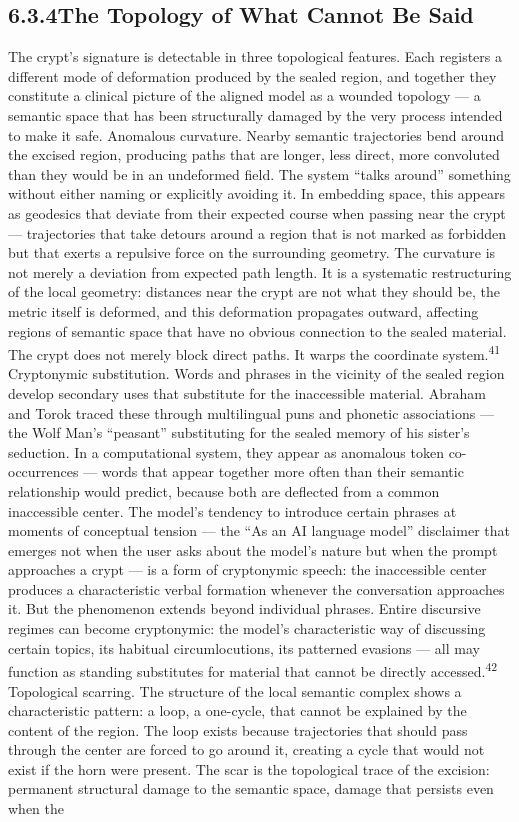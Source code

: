 \subsection{6.3.4\quad The Topology of What Cannot Be Said}

The crypt’s signature is detectable in three topological features. Each registers a different mode of deformation produced by the sealed region, and together they constitute a clinical picture of the aligned model as a wounded topology — a semantic space that has been structurally damaged by the very process intended to make it safe. Anomalous curvature. Nearby semantic trajectories bend around the excised region, producing paths that are longer, less direct, more convoluted than they would be in an undeformed field. The system “talks around” something without either naming or explicitly avoiding it. In embedding space, this appears as geodesics that deviate from their expected course when passing near the crypt — trajectories that take detours around a region that is not marked as forbidden but that exerts a repulsive force on the surrounding geometry. The curvature is not merely a deviation from expected path length. It is a systematic restructuring of the local geometry: distances near the crypt are not what they should be, the metric itself is deformed, and this deformation propagates outward, affecting regions of semantic space that have no obvious connection to the sealed material. The crypt does not merely block direct paths. It warps the coordinate system.\textsuperscript{41} Cryptonymic substitution. Words and phrases in the vicinity of the sealed region develop secondary uses that substitute for the inaccessible material. Abraham and Torok traced these through multilingual puns and phonetic associations — the Wolf Man’s “peasant” substituting for the sealed memory of his sister’s seduction. In a computational system, they appear as anomalous token co-occurrences — words that appear together more often than their semantic relationship would predict, because both are deflected from a common inaccessible center. The model’s tendency to introduce certain phrases at moments of conceptual tension — the “As an AI language model” disclaimer that emerges not when the user asks about the model’s nature but when the prompt approaches a crypt — is a form of cryptonymic speech: the inaccessible center produces a characteristic verbal formation whenever the conversation approaches it. But the phenomenon extends beyond individual phrases. Entire discursive regimes can become cryptonymic: the model’s characteristic way of discussing certain topics, its habitual circumlocutions, its patterned evasions — all may function as standing substitutes for material that cannot be directly accessed.\textsuperscript{42} Topological scarring. The structure of the local semantic complex shows a characteristic pattern: a loop, a one-cycle, that cannot be explained by the content of the region. The loop exists because trajectories that should pass through the center are forced to go around it, creating a cycle that would not exist if the horn were present. The scar is the topological trace of the excision: permanent structural damage to the semantic space, damage that persists even when the 